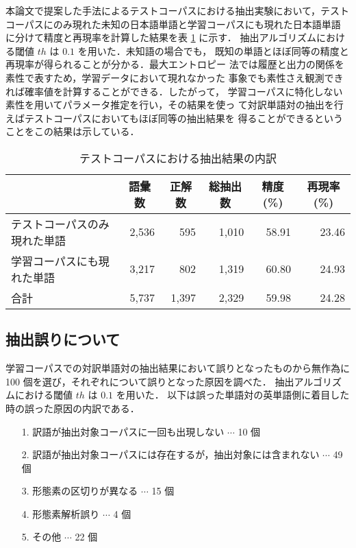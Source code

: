 本論文で提案した手法によるテストコーパスにおける抽出実験において，テスト
コーパスにのみ現れた未知の日本語単語と学習コーパスにも現れた日本語単語
に分けて精度と再現率を計算した結果を表 \ref{tab:test_corpus} に示す．
抽出アルゴリズムにおける閾値 $th$ は $0.1$ を用いた．未知語の場合でも，
既知の単語とほぼ同等の精度と再現率が得られることが分かる．最大エントロピー
法では履歴と出力の関係を素性で表すため，学習データにおいて現れなかった
事象でも素性さえ観測できれば確率値を計算することができる．したがって，
学習コーパスに特化しない素性を用いてパラメータ推定を行い，その結果を使っ
て対訳単語対の抽出を行えばテストコーパスにおいてもほぼ同等の抽出結果を
得ることができるということをこの結果は示している．
\begin{table}[tbp]
  \centering
  \caption{テストコーパスにおける抽出結果の内訳}
  \label{tab:test_corpus}
  \begin{tabular}{l|r|rr|rr} \hline
    &
    \multicolumn{1}{c|}{\small{語彙数}} &
    \multicolumn{1}{c}{\small{正解数}} &
    \multicolumn{1}{c|}{\small{総抽出数}} &
    \multicolumn{1}{c}{\small{精度(\%)}} &
    \multicolumn{1}{c}{\small{再現率(\%)}} \\ \hline
    
    テストコーパスのみ現れた単語 &
    2,536 &
    595 & 1,010 &
    58.91 & 23.46 \\
    
    学習コーパスにも現れた単語 &
    3,217 &
    802 & 1,319 &
    60.80 & 24.93 \\ \hline

    合計 &
    5,737 &
    1,397 & 2,329 &
    59.98 & 24.28 \\ \hline
  \end{tabular}
\end{table}

\subsection{抽出誤りについて}
\label{sec:correspondance_j_e}

学習コーパスでの対訳単語対の抽出結果において誤りとなったものから無作為に
100 個を選び，それぞれについて誤りとなった原因を調べた．
抽出アルゴリズムにおける閾値 $th$ は $0.1$ を用いた．
以下は誤った単語対の英単語側に着目した時の誤った原因の内訳である．

\begin{enumerate}
\item[1.] 訳語が抽出対象コーパスに一回も出現しない $\cdots$ 10 個
\item[2.] 訳語が抽出対象コーパスには存在するが，抽出対象には含まれない
  $\cdots$ 49 個
\item[3.] 形態素の区切りが異なる $\cdots$ 15 個
\item[4.] 形態素解析誤り $\cdots$ 4 個
\item[5.] その他 $\cdots$ 22 個
\end{enumerate}

